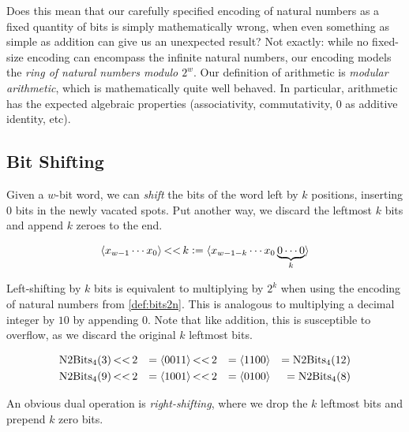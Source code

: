 Does this mean that our carefully specified encoding of natural
numbers as a fixed quantity of bits is simply mathematically wrong,
when even something as simple as addition can give us an unexpected
result?  Not exactly: while no fixed-size encoding can encompass the
infinite natural numbers, our encoding models the \emph{ring
  of natural numbers modulo $2^{w}$}.  Our definition of arithmetic is
\emph{modular arithmetic}, which is mathematically quite well behaved.
In particular, arithmetic has the expected algebraic properties
(associativity, commutativity, $0$ as additive identity, etc).

\subsection{Bit Shifting}
\label{sec:bitshift}

Given a $w$-bit word, we can \emph{shift} the bits of the word left by
$k$ positions, inserting $0$ bits in the newly vacated spots.  Put
another way, we discard the leftmost $k$ bits and append $k$ zeroes to
the end.

\begin{definition}
  \begin{align*}
  \langle x_{w-1}\cdots{}x_{0} \rangle \operatorname{<<} k \vcentcolon=
  \langle x_{w-1-k}\cdots{}x_{0} \underbrace{0\cdots 0}_{k} \rangle
  \end{align*}
  \label{def:bits-leftshift}
\end{definition}

Left-shifting by $k$ bits is equivalent to multiplying by $2^{k}$ when
using the encoding of natural numbers from \cref{def:bits2n}.  This is
analogous to multiplying a decimal integer by $10$ by appending $0$.
Note that like addition, this is susceptible to overflow, as we
discard the original $k$ leftmost bits.

\begin{example}[Left-shifting bit vectors with $w=4$]
  \begin{align}
    \mathrm{N2Bits}_{4}(3) \operatorname{<<} 2 &&= \langle 0011 \rangle \operatorname{<<} 2 &&= \langle 1100 \rangle &&= \mathrm{N2Bits}_{4}(12) \\
    \mathrm{N2Bits}_{4}(9) \operatorname{<<} 2 &&= \langle 1001 \rangle \operatorname{<<} 2 &&= \langle 0100 \rangle &&= \mathrm{N2Bits}_{4}(8)
  \end{align}
\end{example}

An obvious dual operation is \emph{right-shifting}, where we drop the
$k$ leftmost bits and prepend $k$ zero bits.

